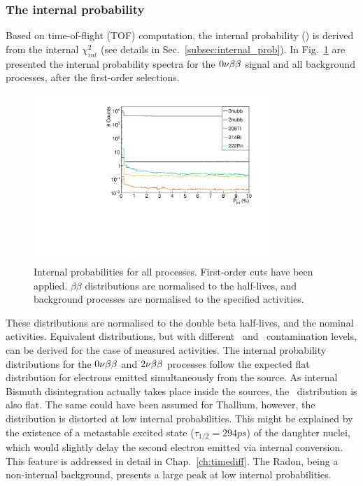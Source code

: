 \subsubsection{The internal probability}
Based on time-of-flight (TOF) computation, the internal probability (\Pint) is derived from the internal $\chi^{2}_{int}$ (see details in Sec.~\ref{subsec:internal_prob}).
In Fig.~\ref{fig:Pint} are presented the internal probability spectra for the $0\nu\beta\beta$ signal and all background processes, after the first-order selections.
\begin{figure}[h!]
  \centering
  \includegraphics[width=0.8\textwidth]{Sensitivity/fig_sensitivity/InternalProbability.pdf}
  \caption{Internal probabilities for all processes.
    First-order cuts have been applied.
    $\beta\beta$ distributions are normalised to the half-lives, and background processes are normalised to the specified activities.
    \label{fig:Pint}}
\end{figure}
These distributions are normalised to the double beta half-lives, and the nominal activities.
Equivalent distributions, but with different \Bi\ and \Tl\ contamination levels, can be derived for the case of measured activities.
The internal probability distributions for the $0\nu\beta\beta$ and $2\nu\beta\beta$ processes follow the expected flat distribution for electrons emitted simultaneously from the source.
As internal Bismuth disintegration actually takes place inside the sources, the \Bi\ distribution is also flat.
The same could have been assumed for Thallium, however, the distribution is distorted at low internal probabilities.
This might be explained by the existence of a metastable excited state ($\tau_{1/2} = 294 ps$) of the daughter nuclei, which would slightly delay the second electron emitted via internal conversion.
This feature is addressed in detail in Chap.~\ref{ch:timediff}.
The Radon, being a non-internal background, presents a large peak at low internal probabilities.

